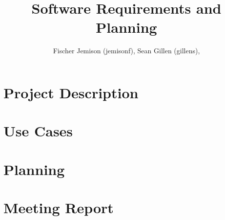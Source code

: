 \documentclass[12pt]{article}
\title{Software Requirements  and Planning}
\author{Fischer Jemison (jemisonf), Sean Gillen (gillens), }
\begin{document}
\maketitle
\tableofcontents


\section{Project Description}
\section{Use Cases}
\section{Planning}
\section{Meeting Report}
\end{document}
